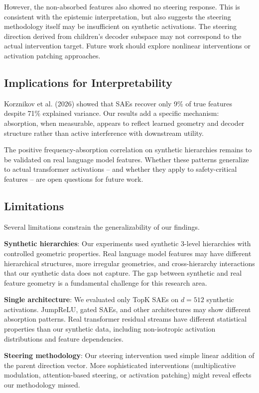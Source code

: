 \documentclass{article}
\begin{document}
However, the non-absorbed features also showed no steering response. This is consistent with the epistemic interpretation, but also suggests the steering methodology itself may be insufficient on synthetic activations. The steering direction derived from children's decoder subspace may not correspond to the actual intervention target. Future work should explore nonlinear interventions or activation patching approaches.

\subsection{Implications for Interpretability}

Korznikov et al. (2026) showed that SAEs recover only 9\% of true features despite 71\% explained variance. Our results add a specific mechanism: absorption, when measurable, appears to reflect learned geometry and decoder structure rather than active interference with downstream utility.

The positive frequency-absorption correlation on synthetic hierarchies remains to be validated on real language model features. Whether these patterns generalize to actual transformer activations -- and whether they apply to safety-critical features -- are open questions for future work.

\subsection{Limitations}

Several limitations constrain the generalizability of our findings.

\textbf{Synthetic hierarchies}: Our experiments used synthetic 3-level hierarchies with controlled geometric properties. Real language model features may have different hierarchical structures, more irregular geometries, and cross-hierarchy interactions that our synthetic data does not capture. The gap between synthetic and real feature geometry is a fundamental challenge for this research area.

\textbf{Single architecture}: We evaluated only TopK SAEs on $d=512$ synthetic activations. JumpReLU, gated SAEs, and other architectures may show different absorption patterns. Real transformer residual streams have different statistical properties than our synthetic data, including non-isotropic activation distributions and feature dependencies.

\textbf{Steering methodology}: Our steering intervention used simple linear addition of the parent direction vector. More sophisticated interventions (multiplicative modulation, attention-based steering, or activation patching) might reveal effects our methodology missed.
\end{document}
